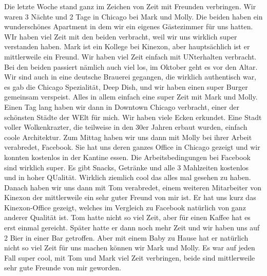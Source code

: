 \documentclass[11pt]{book}
\begin{document}
Die letzte Woche stand ganz im Zeichen von Zeit mit Freunden verbringen. Wir waren 3 Nächte und 2 Tage in Chicago bei Mark und Molly. Die beiden haben 
ein wunderschönes Apartment in dem wir ein eigenes Gästezimmer für uns hatten. WIr haben viel Zeit mit den beiden verbracht, weil wir uns wirklich super verstanden haben. 
Mark ist ein Kollege bei Kinexon, aber hauptsächlich ist er mittlerweile ein Freund. Wir haben viel Zeit einfach mit UNterhalten verbracht. Bei den beiden passiert 
nämlich auch viel los, im Oktober geht es vor den Altar. Wir sind auch in eine deutsche Brauerei gegangen, die wirklich authentisch war, es gab die Chicago 
Spezialität, Deep Dish, und wir haben einen super Burger gemeinsam verspeist. Alles in allem einfach eine super Zeit mit Mark und Molly. Einen Tag lang haben 
wir dann in Downtown Chicago verbracht, einer der schönsten Städte der WElt für mich. Wir haben viele Ecken erkundet. Eine Stadt voller Wolkenkrazter, die teilweise 
in den 30er Jahren erbaut wurden, einfach coole Architektur. Zum Mittag haben wir uns dann mit Molly bei ihrer Arbeit verabredet, Facebook. Sie hat uns deren 
ganzes Office in Chicago gezeigt und wir konnten kostenlos in der Kantine essen. Die Arbeitsbedingungen bei Facebook sind wirklich super. Es gibt Snacks, Getränke 
und alle 3 Mahlzeiten kostenlos und in hoher QUalität. Wirklich ziemlich cool das alles mal gesehen zu haben. Danach haben wir uns dann mit Tom verabredet, 
einem weiteren Mitarbeiter von Kinexon der mittlerweile ein sehr guter Freund von mir ist. Er hat uns kurz das Kinexon-Office gezeigt, welches im Vergleich 
zu Facebook natürlich von ganz anderer Qualität ist. Tom hatte nicht so viel Zeit, aber für einen Kaffee hat es erst einmal gereicht. Später hatte er dann noch mehr 
Zeit und wir haben uns auf 2 Bier in einer Bar getroffen. Aber mit einem Baby zu Hause hat er natürlich nicht so viel Zeit für uns machen können wir Mark und Molly. 
Es war auf jeden Fall super cool, mit Tom und Mark viel Zeit verbringen, beide sind mittlerweile sehr gute Freunde von mir geworden. 
\end{document}
